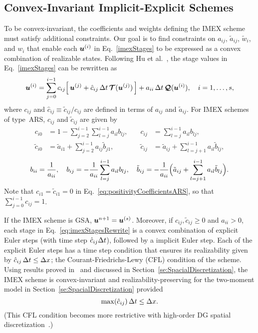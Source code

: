 \subsection{Convex-Invariant Implicit-Explicit Schemes}

To be convex-invariant, the coefficients and weights defining the IMEX scheme must satisfy additional constraints.
Our goal is to find constraints on $a_{ij}$, $\tilde{a}_{ij}$, $\tilde{w}_{i}$, and $w_{i}$ that enable each $\boldsymbol{u}^{(i)}$ in Eq.~\eqref{imexStages} to be expressed as a convex combination of realizable states.  
Following Hu et al.~\cite{hu_etal_2018}, the stage values in Eq.~\eqref{imexStages} can be rewritten as
\begin{equation}
  \boldsymbol{u}^{(i)}
  =\sum_{j=0}^{i-1}c_{ij}\Big[\,\boldsymbol{u}^{(j)}+\hat{c}_{ij}\,\Delta t\,\boldsymbol{\mathcal{T}}(\boldsymbol{u}^{(j)})\,\Big] + a_{ii}\,\Delta t\,\boldsymbol{\mathcal{Q}}(\boldsymbol{u}^{(i)}),\quad i=1,\ldots,s,
  \label{eq:imexStagesRewrite}
\end{equation}
where $c_{ij}$ and $\hat{c}_{ij}\equiv\tilde{c}_{ij}/c_{ij}$ are defined in terms of $a_{ij}$ and $\tilde{a}_{ij}$.
For IMEX schemes of type~ARS, $c_{ij}$ and $\tilde{c}_{ij}$ are given by
    \begin{equation}
     \begin{aligned}
      c_{i0} &= 1-\sum_{j=2}^{i-1}\sum_{l=j}^{i-1}a_{il}b_{lj}, \quad &
      c_{ij} &= \sum_{l=j}^{i-1}a_{il}b_{lj}, \\
      \tilde{c}_{i0} &= \tilde{a}_{i1}+\sum_{j=2}^{i-1}a_{ij}\tilde{b}_{j1}, \quad &
      \tilde{c}_{ij} &= \tilde{a}_{ij}+\sum_{l=j+1}^{i-1}a_{il}\tilde{b}_{lj},  
     \end{aligned}
     \label{eq:positivityCoefficientsARS}
    \end{equation}
    \begin{equation}
      b_{ii} = \frac{1}{a_{ii}}, \quad
      b_{ij} = -\frac{1}{a_{ii}}\sum_{l=j}^{i-1}a_{il}b_{lj}, \quad
      \tilde{b}_{ij} = -\frac{1}{a_{ii}}\Big(\tilde{a}_{ij}+\sum_{l=j+1}^{i-1}a_{il}\tilde{b}_{lj}\Big).  
    \end{equation}
Note that $c_{i1}=\tilde{c}_{i1}=0$ in Eq.~\eqref{eq:positivityCoefficientsARS}, so that $\sum_{j=0}^{i-1}c_{ij}=1$.

If the IMEX scheme is GSA, $\boldsymbol{u}^{n+1} = \boldsymbol{u}^{(s)}$.  
Moreover, if $c_{ij},\tilde{c}_{ij}\ge0$ and $a_{ii}>0$, each stage in Eq.~\eqref{eq:imexStagesRewrite} is a convex combination of explicit Euler steps (with time step $\hat{c}_{ij}\Delta t$), followed by a implicit Euler step.  
Each of the explicit Euler steps has a time step condition that ensures its realizability given by $\hat{c}_{ij}\,\Delta t\leq\Delta x$; the Courant-Friedrichs-Lewy (CFL) condition of the scheme.
Using results proved in~\cite{chu_etal_2018} and discussed in Section~\ref{se:SpacialDiscretization}, the IMEX scheme is convex-invariant and realizability-preserving for the two-moment model in Section~\ref{se:SpacialDiscretization} provided
\begin{equation}
  \max(\hat{c}_{ij})\,\Delta t \leq \Delta x.  
\end{equation}
(This CFL condition becomes more restrictive with high-order DG spatial discretization~\cite{chu_etal_2018}.)

